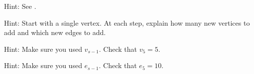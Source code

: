 \subsubsection*{ \answers}
\begin{apart}
    \item Hint: See .
    \item Hint: Start with a single vertex.  At each step, explain how many new vertices to add and which new edges to add.
    \item Hint: Make sure you used $v_{s-1}$. Check that $v_5=5$.
    \item Hint: Make sure you used $e_{s-1}$. Check that $e_5=10$.
\end{apart}
















